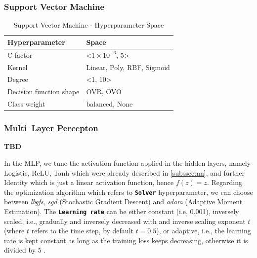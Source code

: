 \subsubsection{Support Vector Machine}

\begin{table}[H]
\small
\setlength{\tabcolsep}{8pt}
\renewcommand{\arraystretch}{1.3}
\centering
    \caption[Support Vector Machine - Hyperparameter Space]{Support Vector Machine - Hyperparameter Space}\label{tab:svmspace}
    \begin{tabular}{ll}
\toprule
\textbf{Hyperparameter} & \textbf{Space}\\
\midrule
\hline
C factor & <$1\times 10^{-6}$, 5> \\
Kernel & Linear, Poly, RBF, Sigmoid \\
Degree & <1, 10> \\
Decision function shape & OVR, OVO \\
Class weight & balanced, None \\
\hline
\bottomrule
\end{tabular}
\vspace{0.7em}

\vspace{-1em}
\end{table}


\subsubsection{Multi--Layer Percepton}
\textbf{TBD}

In the MLP, we tune the activation function applied in the hidden layers, namely Logistic, ReLU, Tanh which were already described in \autoref{subssec:nn}, and further Identity which is just a linear activation function, hence $f(z) = z$.
Regarding the optimization algorithm which refers to \textbf{\texttt{Solver}} hyperparameter, we can choose between \textit{lbgfs}, \textit{sgd} (Stochastic Gradient Descent) and \textit{adam} (Adaptive Moment Estimation).
The \textbf{\texttt{Learning rate}} can be either constant (i.e, 0.001), inversely scaled, i.e., gradually and inversely decreased with and inverse scaling exponent $t$ (where $t$ refers to the time step, by default $t=0.5$), or adaptive, i.e., the learning rate is kept constant as long as the training loss keeps decreasing, otherwise it is divided by 5 \citep{scikit-mlp}.

